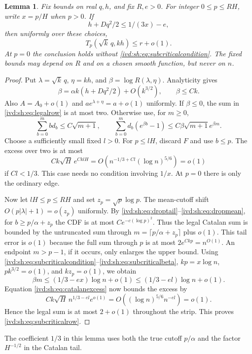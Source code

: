 \documentclass[11pt,letterpaper]{article}
\newtheorem{lemma}[theorem]{Lemma}
\theoremstyle{remark}\newtheorem{remark}[theorem]{Remark}
\numberwithin{equation}{section}
\begin{document}
\begin{lemma}\label{ivd:sh:lem:subcritical}
Fix bounds on real $q,h$, and fix $R,e>0$. For integer
$0\le p\le RH$, write $x=p/H$ when $p>0$. If
\begin{equation}\label{ivd:sh:eq:subcriticalcondition}
 h+Dq^2/2\le1/(3x)-e,
\end{equation}
then uniformly over these choices,
\begin{equation}\label{ivd:sh:eq:subcriticalrow}
 T_p(\sqrt k\,q,kh)\le r+o(1).
\end{equation}
At $p=0$ the conclusion holds without \eqref{ivd:sh:eq:subcriticalcondition}.
The fixed bounds may depend on $R$ and on a chosen smooth function,
but never on $n$.
\end{lemma}
\begin{proof}
Put $\lambda=\sqrt k\,q$, $\eta=kh$, and $\beta=\log R(\lambda,\eta)$.
Analyticity gives
\begin{equation}\label{ivd:sh:eq:subcriticalbeta}
 \beta=\alpha k(h+Dq^2/2)+O(k^{3/2}),\qquad \beta\le Ck.
\end{equation}
Also $A=A_0+o(1)$ and $ae^{\lambda+\eta}=a+o(1)$ uniformly.
If $\beta\le0$, the sum in \eqref{ivd:sh:eq:legalrow} is at most two.
Otherwise use, for $m\ge0$,
\begin{equation}\label{ivd:sh:eq:catalanexcess}
 \sum_{b=0}^m b d_b\le C\sqrt{m+1},\qquad
 \sum_{b=0}^m d_b(e^{\beta b}-1)
       \le C\beta\sqrt{m+1}e^{\beta m}.
\end{equation}
Choose a sufficiently small fixed $l>0$. For $p\le lH$, discard
$F$ and use $b\le p$. The excess over two is at most
\[
 Ck\sqrt H\,e^{CklH}
 =O(n^{-1/3+Cl}(\log n)^{5/6})=o(1)
\]
if $Cl<1/3$. This case needs no condition involving $1/x$.
At $p=0$ there is only the ordinary edge.

Now let $lH\le p\le RH$ and set $z_p=\sqrt p\log p$.
The mean-cutoff shift $O(p|\lambda|+1)=o(z_p)$ uniformly.
By \eqref{ivd:sh:eq:droptail}--\eqref{ivd:sh:eq:dropmean}, for
$b\ge p/\alpha+z_p$ the CDF is at most $Ce^{-c(\log p)^2}$.
Thus the legal Catalan sum is bounded by the untruncated sum through
$m=\lceil p/\alpha+z_p\rceil$ plus $o(1)$. This tail error is
$o(1)$ because the full sum through $p$ is at most
$2e^{Ckp}=n^{O(1)}$. An endpoint $m>p-1$, if it occurs, only enlarges
the upper bound.
Using \eqref{ivd:sh:eq:subcriticalcondition}--\eqref{ivd:sh:eq:subcriticalbeta},
$kp=x\log n$, $pk^{3/2}=o(1)$, and $kz_p=o(1)$, we obtain
\[
 \beta m\le(1/3-ex)\log n+o(1)
             \le(1/3-el)\log n+o(1).
\]
Equation \eqref{ivd:sh:eq:catalanexcess} now bounds the excess by
\[
 Ck\sqrt H\,n^{1/3-el}e^{o(1)}
 =O((\log n)^{5/6}n^{-el})=o(1).
\]
Hence the legal sum is at most $2+o(1)$ throughout the strip.
This proves \eqref{ivd:sh:eq:subcriticalrow}.
\end{proof}
The coefficient $1/3$ in this lemma uses both the true cutoff
$p/\alpha$ and the factor $H^{-1/2}$ in the Catalan tail.
\end{document}
